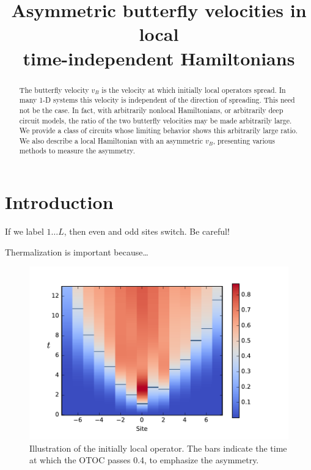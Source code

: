 \documentclass[aps,prx,reprint,superscriptaddress, longbibliography]{revtex4-1}
\newcommand{\charlie}[1]{ {\color{Magenta} {{#1}}}}
\begin{document}
\title{Asymmetric butterfly velocities in local\\ time-independent Hamiltonians
} 
%

\begin{abstract}
The butterfly velocity $v_B$ is the velocity at which initially local operators spread. In many 1-D systems this velocity is independent of the direction of spreading. This need not be the case. In fact, with arbitrarily nonlocal Hamiltonians, or arbitrarily deep circuit models, the ratio of the two butterfly velocities may be made arbitrarily large. We provide a class of circuits whose limiting behavior shows this arbitrarily large ratio. We also describe a local Hamiltonian with an asymmetric $v_B$, presenting various methods to measure the asymmetry.
\end{abstract}

\maketitle

\section{Introduction}

\charlie{If we label $1\dots L$, then even and odd sites switch. Be careful!}

Thermalization is important because\dots

\begin{figure}
	\includegraphics[width=\columnwidth]{colorplot}
	\caption{Illustration of the initially local operator. The bars indicate the time at which the OTOC passes 0.4, to emphasize the asymmetry.}
	\label{fig:colorplot}
\end{figure}
\end{document}
